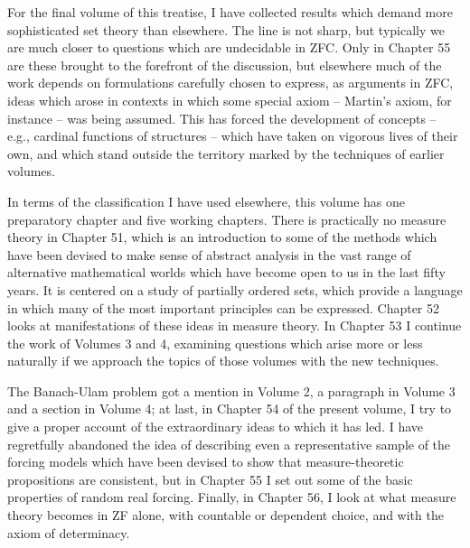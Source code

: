  
 
\medskip 
      
For the final volume of this treatise, I have collected results which 
demand more sophisticated set theory than elsewhere.   The line is not 
sharp, but typically we are much closer to questions which are undecidable 
in ZFC.   Only in Chapter 55 are these brought to the forefront of the 
discussion, but elsewhere much of the work depends on formulations 
carefully chosen to express, as arguments in ZFC, ideas which arose in 
contexts in which some special axiom -- Martin's axiom, for instance -- was 
being assumed.   This has forced the development of concepts -- e.g., 
cardinal functions of structures -- which have taken on vigorous lives of  
their own, and 
which stand outside the territory marked by the techniques of earlier 
volumes. 
 
In terms of the classification I have used elsewhere, this volume has  
one preparatory chapter and five working chapters.   There is practically 
no measure theory in Chapter 51, which is an introduction to some of the 
methods which have been devised to make sense of abstract analysis in 
the vast range of alternative mathematical 
worlds which have become open to us in the last fifty years. 
It is centered on a study of partially ordered sets, which provide a 
language in which many of the most important principles can be expressed. 
Chapter 52 looks at manifestations of these ideas in measure theory.   In 
Chapter 53 I continue the work of Volumes 3 and 4, examining questions 
which arise more or less naturally if we approach the topics of those 
volumes with the new techniques. 
 
The Banach-Ulam problem got a mention in Volume 2, a paragraph in Volume 3 
and a section in Volume 4;  
at last, in Chapter 54 of the present volume, I try to give a proper 
account of the extraordinary ideas to which it has led.   I have 
regretfully abandoned the idea of describing even a representative sample 
of the forcing models which have been devised to show that 
measure-theoretic propositions are consistent, but in Chapter 55 I set out 
some of the basic properties of random real forcing.   Finally, in Chapter 
56, I look at what measure theory becomes in ZF alone, with countable 
or dependent choice, and with the axiom of determinacy. 
 

